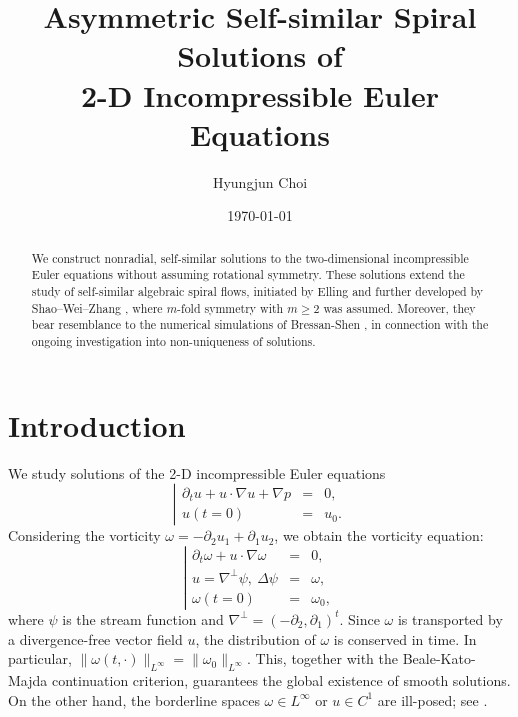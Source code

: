 \documentclass[11pt]{article}
\theoremstyle{definition}
\theoremstyle{remark}
\numberwithin{equation}{section}
\newcommand{\del}{\partial}
\newcommand{\grad}{\nabla}
\newcommand{\norm}[1]{\lVert #1 \rVert}
\begin{document}
\title{Asymmetric Self-similar Spiral Solutions of\\2-D Incompressible Euler Equations}
\author{Hyungjun Choi}%
\date{\today}
\maketitle

\begin{abstract}
We construct nonradial, self-similar solutions to the two-dimensional incompressible Euler equations without assuming rotational symmetry. These solutions extend the study of self-similar algebraic spiral flows, initiated by Elling and further developed by Shao–Wei–Zhang \cite{SWZ25}, where $m$-fold symmetry with $m \geq 2$ was assumed. Moreover, they bear resemblance to the numerical simulations of Bressan-Shen \cite{BS21}, in connection with the ongoing investigation into non-uniqueness of solutions.
\end{abstract}


\section{Introduction}
We study solutions of the 2-D incompressible Euler equations
\begin{equation} \label{eq:1.1} \left\vert \begin{array}{rcl}
	\del_t u + u \cdot \grad u + \grad p &=& 0, \\
	u(t=0) &=& u_0.
\end{array} \right.\end{equation}
Considering the vorticity $\omega = -\del_2 u_1 + \del_1 u_2$, we obtain the vorticity equation:
\begin{equation} \label{eq:1.2} \left\vert \begin{array}{rcl}
	\del_t \omega + u \cdot \grad \omega &=& 0, \\
	u = \grad^\perp \psi,~\Delta\psi &=& \omega, \\
	\omega(t=0) &=& \omega_0,
\end{array} \right.\end{equation}
where $\psi$ is the stream function and $\grad^\perp = (-\del_2, \del_1)^t$. Since $\omega$ is transported by a divergence-free vector field $u$, the distribution of $\omega$ is conserved in time. In particular, $\norm{\omega(t,\cdot)}_{L^\infty} = \norm{\omega_0}_{L^\infty}$. This, together with the Beale-Kato-Majda continuation criterion, guarantees the global existence of smooth solutions. On the other hand, the borderline spaces $\omega\in L^\infty$ or $u\in C^1$ are ill-posed; see \cite{BD15, EM20}.
\end{document}
